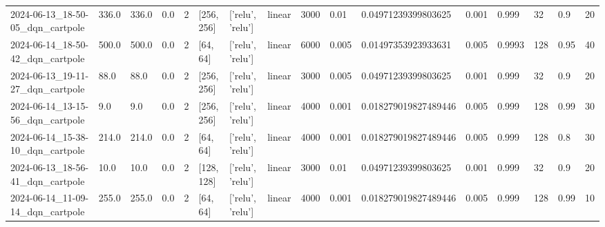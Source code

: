 \documentclass[a4paper,12pt]{article}
\begin{document}
\begin{table}[]
\begin{tabular}{llllllllllllllll}
    2024-06-13\_18-50-05\_dqn\_cartpole & 336.0                 & 336.0                   & 0.0                    & 2              & {[}256, 256{]}           & {[}'relu', 'relu'{]}                 & linear                    & 3000          & 0.01           & 0.04971239399803625  & 0.001        & 0.999          & 32          & 0.9      & 20                    \\
    2024-06-14\_18-50-42\_dqn\_cartpole & 500.0                 & 500.0                   & 0.0                    & 2              & {[}64, 64{]}             & {[}'relu', 'relu'{]}                 & linear                    & 6000          & 0.005          & 0.01497353923933631  & 0.005        & 0.9993         & 128         & 0.95     & 40                    \\
    2024-06-13\_19-11-27\_dqn\_cartpole & 88.0                  & 88.0                    & 0.0                    & 2              & {[}256, 256{]}           & {[}'relu', 'relu'{]}                 & linear                    & 3000          & 0.005          & 0.04971239399803625  & 0.001        & 0.999          & 32          & 0.9      & 20                    \\
    2024-06-14\_13-15-56\_dqn\_cartpole & 9.0                   & 9.0                     & 0.0                    & 2              & {[}256, 256{]}           & {[}'relu', 'relu'{]}                 & linear                    & 4000          & 0.001          & 0.018279019827489446 & 0.005        & 0.999          & 128         & 0.99     & 30                    \\
    2024-06-14\_15-38-10\_dqn\_cartpole & 214.0                 & 214.0                   & 0.0                    & 2              & {[}64, 64{]}             & {[}'relu', 'relu'{]}                 & linear                    & 4000          & 0.001          & 0.018279019827489446 & 0.005        & 0.999          & 128         & 0.8      & 30                    \\
    2024-06-13\_18-56-41\_dqn\_cartpole & 10.0                  & 10.0                    & 0.0                    & 2              & {[}128, 128{]}           & {[}'relu', 'relu'{]}                 & linear                    & 3000          & 0.01           & 0.04971239399803625  & 0.001        & 0.999          & 32          & 0.9      & 20                    \\
    2024-06-14\_11-09-14\_dqn\_cartpole & 255.0                 & 255.0                   & 0.0                    & 2              & {[}64, 64{]}             & {[}'relu', 'relu'{]}                 & linear                    & 4000          & 0.001          & 0.018279019827489446 & 0.005        & 0.999          & 128         & 0.99     & 10                    \\

\end{tabular}
\end{table}
\end{document}
